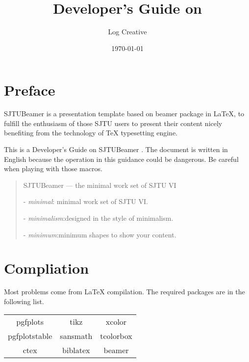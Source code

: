 \documentclass{article}
\title{Developer's Guide on\\ \tmin}
\author{Log Creative}
\date{\today}
\def\tmin{\textsf{SJTUBeamer} \fbox{\textsc{min}}}
\begin{document}
    \maketitle
    \tableofcontents
    \section{Preface}

    \tmin{} is a presentation template based on \textsf{beamer} package in \LaTeX{}, to fulfill the enthusiasm of those SJTU users to present their content nicely benefiting from the technology of \TeX{} typesetting engine.
    
    This is a Developer's Guide on \tmin{} . The document is written in English because the operation in this guidance could be dangerous. Be careful when playing with those macros.

    \begin{quotation}
        \begin{center}
            \tmin{} --- the minimal work set of SJTU VI
        \end{center}
        \vspace*{1em}

         - \emph{minimal}: \hfill minimal work set of SJTU VI.

         - \emph{minimalism}:\hfill  designed in the style of minimalism.

         - \emph{minimum}:\hfill  minimum shapes to show your content.
    \end{quotation}

    \section{Compliation}

    Most problems come from \LaTeX{} compilation. The required packages are in the following list.
    
    \begin{table}[h]
        \centering
        \begin{tabular}{>{\sffamily}c>{\sffamily}c>{\sffamily}c}
            \hline
            pgfplots & tikz & xcolor \\
            pgfplotstable & sansmath & tcolorbox \\
            ctex & biblatex & beamer \\
            \hline
        \end{tabular}
    \end{table}
\end{document}
